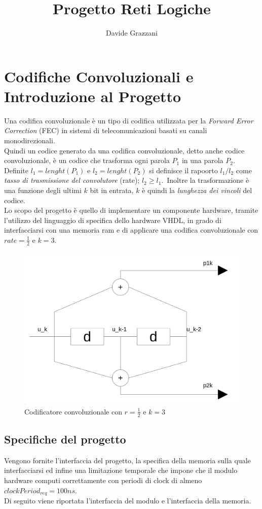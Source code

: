 \documentclass[11pt,a4paper]{article}
\author{\Large Davide Grazzani}
\title{\Huge \Huge Progetto Reti Logiche}
\date{}
\begin{document}
    \maketitle
    \newpage

    \tableofcontents
    \newpage

    \section{Codifiche Convoluzionali e Introduzione al Progetto}
    Una codifica convoluzionale è un tipo di codifica utilizzata per la \textit{Forward Error Correction} (FEC) in sistemi di telecomunicazioni basati su canali monodirezionali. \\
    Quindi un codice generato da una codifica convoluzionale, detto anche codice convoluzionale, è un codice che trasforma ogni parola $P_1$ in una parola $P_2$. Definite $l_1 = lenght(P_1)$ e $l_2 = lenght(P_2)$ si definisce il rapoorto $l_1/l_2$ come \textit{tasso di trasmissione del convolutore} (rate); $l_2 \geq l_1$.\
    Inoltre la trasformazione è una funzione degli ultimi $k$ bit in entrata, $k$ è quindi la \textit{lunghezza dei vincoli} del codice.\\
    Lo scopo del progetto è quello di implementare un componente hardware, tramite l'utilizzo del linguaggio di specifica dello hardware VHDL, in grado di interfacciarsi con una memoria ram e di applicare una codifica convoluzionale con $rate = \frac{1}{2}$ e $k = 3$.
    \begin{figure}[h]
        \centering
        \includegraphics[width = 0.5\linewidth]{convolutore_image.png}
        \caption{Codificatore convoluzionale con $r = \frac{1}{2}$ e $k = 3$}
        \label{codificatore_convoluzionale_image}
    \end{figure}
    \subsection{Specifiche del progetto}
        Vengono fornite l'interfaccia del progetto, la specifica della memoria sulla quale interfacciarsi ed infine una limitazione temporale che impone che il modulo hardware computi correttamente con periodi di clock di almeno $clockPeriod_{req} = 100ns$.\\
        Di seguito viene riportata l'interfaccia del modulo e l'interfaccia della memoria.
\end{document}
